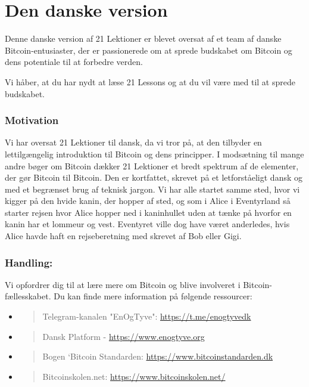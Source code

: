 \part{Den danske version}

Denne danske version af 21 Lektioner er blevet oversat af et team af
danske Bitcoin-entusiaster, der er passionerede om at sprede budskabet
om Bitcoin og dens potentiale til at forbedre verden.

Vi håber, at du har nydt at læse 21 Lessons og at du vil være med til at
sprede budskabet.

\section*{Motivation}

Vi har oversat 21 Lektioner til dansk, da vi tror på, at den tilbyder en
lettilgængelig introduktion til Bitcoin og dens principper. I modsætning
til mange andre bøger om Bitcoin dækker 21 Lektioner et bredt spektrum
af de elementer, der gør Bitcoin til Bitcoin. Den er kortfattet, skrevet
på et letforståeligt dansk og med et begrænset brug af teknisk jargon.
Vi har alle startet samme sted, hvor vi kigger på den hvide kanin, der
hopper af sted, og som i Alice i Eventyrland så starter rejsen hvor
Alice hopper ned i kaninhullet uden at tænke på hvorfor en kanin har et
lommeur og vest. Eventyret ville dog have været anderledes, hvis Alice
havde haft en rejseberetning med skrevet af Bob eller Gigi.
\newpage
\section*{Handling:}

Vi opfordrer dig til at lære mere om Bitcoin og blive involveret i
Bitcoin-fællesskabet. Du kan finde mere information på følgende
ressourcer:

\begin{itemize}
\item
  \begin{quote}
  Telegram-kanalen "EnOgTyve":
  \href{https://t.me/enogtyvedk}{https://t.me/enogtyvedk}
  \end{quote}
\item
  \begin{quote}
  Dansk Platform -
  \href{https://www.enogtyve.org/}{https://www.enogtyve.org}
  \end{quote}
\item
  \begin{quote}
  Bogen `Bitcoin Standarden:
  \href{https://www.bitcoinstandarden.dk/}{https://www.bitcoinstandarden.dk}
  \end{quote}
\item
  \begin{quote}
  Bitcoinskolen.net:
  \href{https://www.bitcoinskolen.net/}{https://www.bitcoinskolen.net/}
  \end{quote}
\end{itemize}


